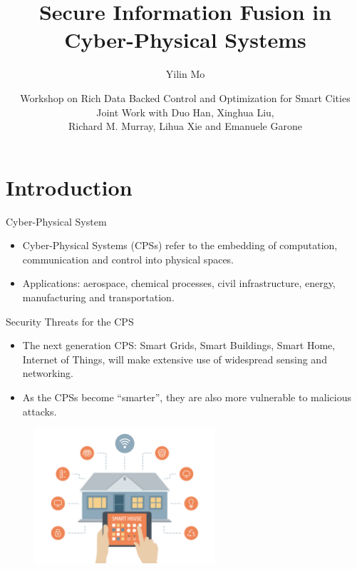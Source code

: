 \documentclass{beamer}
\title[Secure Info Fusion]{Secure Information Fusion in Cyber-Physical Systems}
\author[Yilin Mo]{Yilin Mo}
\institute[NTU]{
  School of EEE\\ Nanyang Technological University\\
}
\date[Dec 11, 2016]{Workshop on Rich Data Backed Control and Optimization for Smart Cities \\ \vspace{1cm}
  \small Joint Work with Duo Han, Xinghua Liu, \\
  Richard M. Murray, Lihua Xie and Emanuele Garone}
\begin{document}
\begin{frame}
  \titlepage
\end{frame}


\section{Introduction}

\begin{frame}{Cyber-Physical System}
  \begin{itemize}
  \item Cyber-Physical Systems (CPSs) refer to the embedding of computation, communication and control into physical spaces.
    \begin{center}
    \end{center}
  \item Applications: aerospace, chemical processes, civil infrastructure, energy, manufacturing and transportation. 
  \end{itemize}
\end{frame}

\begin{frame}{Security Threats for the CPS}
  \begin{itemize}
  \item The next generation CPS: Smart Grids, Smart Buildings, Smart Home, Internet of Things, will make extensive use of widespread sensing and networking.
  \item As the CPSs become ``smarter'', they are also more vulnerable to malicious attacks.
  \end{itemize}
  \begin{figure}[ht]
    \centering
    \includegraphics[width=0.6\textwidth]{SmartHome.jpg}
  \end{figure}
\end{frame}
\end{document}
